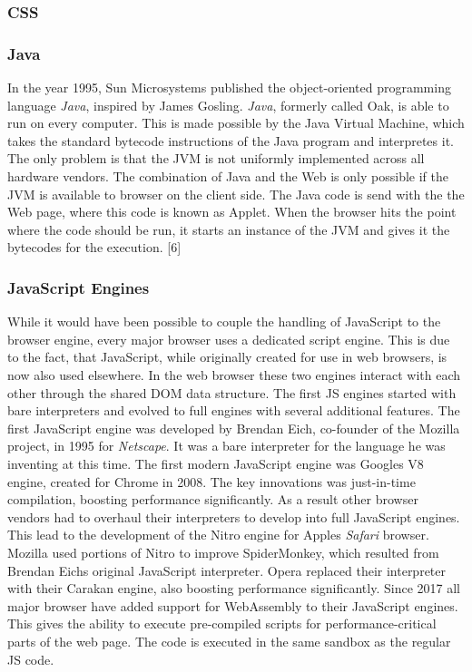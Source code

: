 \documentclass[runningheads]{llncs}
\begin{document}
			\subsubsection{CSS}%
			\subsubsection{Java}
			\leavevmode\newline
			In the year 1995, Sun Microsystems published the object-oriented programming language \textit{Java}, inspired by James Gosling. \textit{Java}, formerly called Oak, is able to run on every computer. This is made possible by the Java Virtual Machine, which takes the standard bytecode instructions of the Java program and interpretes it. The only problem is that the JVM is not uniformly implemented across all hardware vendors. The combination of Java and the Web is only possible if the JVM is available to browser on the client side. The Java code is send with the the Web page, where this code is known as Applet. When the browser hits the point where the code should be run, it starts an instance of the JVM and gives it the bytecodes for the execution. [6]
			\subsubsection{JavaScript Engines} \leavevmode\newline
			While it would have been possible to couple the handling of JavaScript to the browser engine, every major browser uses a dedicated script engine. This is due to the fact, that JavaScript, while originally created for use in web browsers, is now also used elsewhere. In the web browser these two engines interact with each other through the shared DOM data structure.
			The first JS engines started with bare interpreters and evolved to full engines with several additional features. The first JavaScript engine was developed by Brendan Eich, co-founder of the Mozilla project, in 1995 for \textit{Netscape}. It was a bare interpreter for the language he was inventing at this time. The first modern JavaScript engine was Googles V8 engine, created for Chrome in 2008. The key innovations was just-in-time compilation, boosting performance significantly. As a result other browser vendors had to overhaul their interpreters to develop into full JavaScript engines. This lead to the development of the Nitro engine for Apples \textit{Safari} browser. Mozilla used portions of Nitro to improve SpiderMonkey, which resulted from Brendan Eichs original JavaScript interpreter. Opera replaced their interpreter with their Carakan engine, also boosting performance significantly.
			Since 2017 all major browser have added support for WebAssembly to their JavaScript engines. This gives the ability to execute pre-compiled scripts for performance-critical parts of the web page. The code is executed in the same sandbox as the regular JS code.
\end{document}
